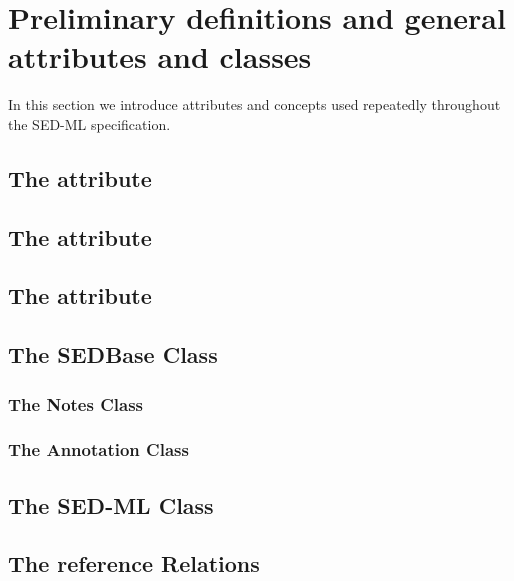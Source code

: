 \section{Preliminary definitions and general attributes and classes}
In this section we introduce attributes and concepts used repeatedly throughout the SED-ML specification. 

\subsection{The  attribute}


\subsection{The   attribute}


\subsection{The  attribute}


\subsection{The SEDBase Class}


\subsubsection{The Notes Class}


\subsubsection{The Annotation Class}


\subsection{The SED-ML Class}


\subsection{The reference Relations}


